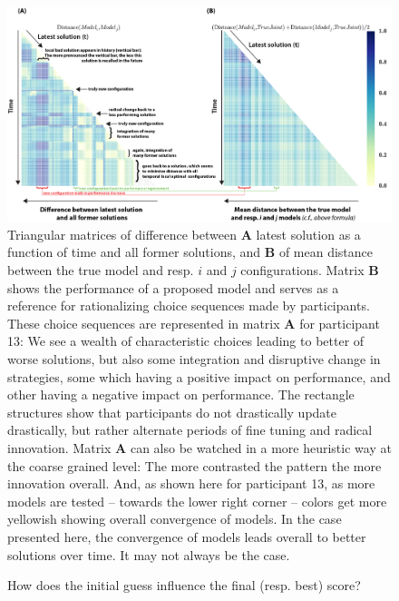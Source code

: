 \begin{figure}[h!]
\begin{center}
\includegraphics[width=15cm]{figures/matrice2.png}
\caption{\footnotesize Triangular matrices of difference between {\bf A} latest solution as a function of time and all former solutions, and {\bf B} of mean distance between the true model and resp. $i$ and $j$ configurations. Matrix {\bf B} shows the performance of a proposed model and serves as a reference for rationalizing choice sequences made by participants. These choice sequences are represented in matrix {\bf A} for participant 13: We see a wealth of characteristic choices leading to better of worse solutions, but also some integration and disruptive change in strategies, some which having a positive impact on performance, and other having a negative impact on performance. The rectangle structures show that participants do not drastically update drastically, but rather alternate periods of fine tuning and radical innovation. Matrix {\bf A} can also be watched in a more heuristic way at the coarse grained level: The more contrasted the pattern the more innovation overall. And, as shown here for participant 13, as more models are tested -- towards the lower right corner -- colors get more yellowish showing overall convergence of models. In the case presented here, the convergence of models leads overall to better solutions over time. It may not always be the case.}
\label{fig:matrices}
\end{center}
\end{figure}


\vspace{1cm}
\begin{figure}[h]
\label{init_final_best}
\caption{How does the initial guess influence the final (resp. best) score?}
\label{figure1}
\end{figure}

